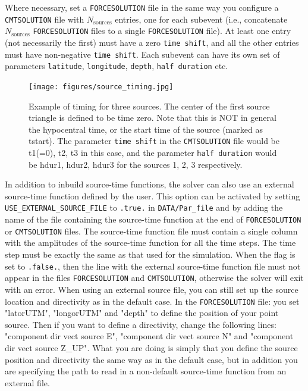 \noindent Where necessary, set a \texttt{FORCESOLUTION} file in the
same way you configure a \texttt{CMTSOLUTION} file with $N_{\mathrm{sources}}$
entries, one for each subevent (i.e., concatenate $N_{\mathrm{sources}}$
\texttt{FORCESOLUTION} files to a single \texttt{FORCESOLUTION} file).
At least one entry (not necessarily the first) must have a zero \texttt{time
shift}, and all the other entries must have non-negative \texttt{time shift}.
Each subevent can have its own set of parameters \texttt{latitude}, \texttt{longitude}, \texttt{depth},
\texttt{half duration} etc.\newline

\begin{figure}[H]
\begin{centering}
\texttt{[image: figures/source\_timing.jpg]}
\par
\end{centering}
\caption{Example of timing for three sources. The center of the first source
triangle is defined to be time zero. Note that this is NOT in general
the hypocentral time, or the start time of the source (marked as tstart).
The parameter \texttt{time shift} in the \texttt{CMTSOLUTION} file
would be t1(=0), t2, t3 in this case, and the parameter \texttt{half
duration} would be hdur1, hdur2, hdur3 for the sources 1, 2, 3 respectively.}
{\small \label{fig:source_timing} }
\end{figure}

In addition to inbuild source-time functions, the solver can also use an external source-time function defined by the user. This option can be activated by setting \texttt{USE\_EXTERNAL\_SOURCE\_FILE} to \texttt{.true.} in \texttt{DATA/Par\_file} and by adding the name of the file containing the source-time function at the end of \texttt{FORCESOLUTION} or \texttt{CMTSOLUTION} files.
The source-time function file must contain a single column with the amplitudes of the source-time function for all the time steps. The time step must be exactly the same as that used for the simulation. When the flag is set to \texttt{.false.}, then the line with the external source-time function file must not appear in the files \texttt{FORCESOLUTION} and \texttt{CMTSOLUTION}, otherwise the solver will exit with an error. When using an external source file, you can still set up the source location and directivity as in the default case.
In the \texttt{FORCESOLUTION} file: you set "latorUTM", "longorUTM" and "depth" to define the position of your point source. Then if you want to define a directivity, change the following lines: "component dir vect source E", "component dir vect source N" and "component dir vect source Z\_UP". What you are doing is simply that you define the source position and directivity the same way as in the default case, but in addition you are specifying the path to read in a non-default source-time function from an external file.

